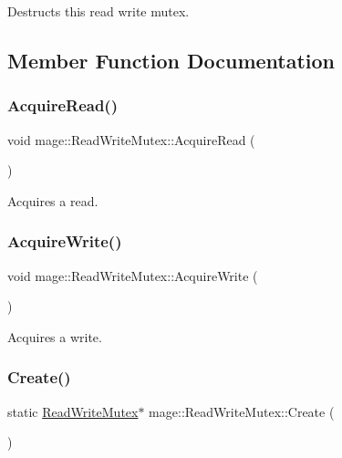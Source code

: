 Destructs this read write mutex. 

\subsection{Member Function Documentation}
\hypertarget{classmage_1_1_read_write_mutex_af78045647078aaf3966c8f1b06e35c92}{}\label{classmage_1_1_read_write_mutex_af78045647078aaf3966c8f1b06e35c92} 
\subsubsection{\texorpdfstring{Acquire\+Read()}{AcquireRead()}}
{\footnotesize\ttfamily void mage\+::\+Read\+Write\+Mutex\+::\+Acquire\+Read (\begin{DoxyParamCaption}{ }\end{DoxyParamCaption})\hspace{0.3cm}{\ttfamily [private]}}

Acquires a read. \hypertarget{classmage_1_1_read_write_mutex_a76137013107a9c2c1fc05c1e0747965e}{}\label{classmage_1_1_read_write_mutex_a76137013107a9c2c1fc05c1e0747965e} 
\subsubsection{\texorpdfstring{Acquire\+Write()}{AcquireWrite()}}
{\footnotesize\ttfamily void mage\+::\+Read\+Write\+Mutex\+::\+Acquire\+Write (\begin{DoxyParamCaption}{ }\end{DoxyParamCaption})\hspace{0.3cm}{\ttfamily [private]}}

Acquires a write. \hypertarget{classmage_1_1_read_write_mutex_ad184ba46c44446b5ebe1026801fcac9b}{}\label{classmage_1_1_read_write_mutex_ad184ba46c44446b5ebe1026801fcac9b} 
\subsubsection{\texorpdfstring{Create()}{Create()}}
{\footnotesize\ttfamily static \hyperlink{classmage_1_1_read_write_mutex}{Read\+Write\+Mutex}$\ast$ mage\+::\+Read\+Write\+Mutex\+::\+Create (\begin{DoxyParamCaption}{ }\end{DoxyParamCaption})\hspace{0.3cm}{\ttfamily [static]}}

